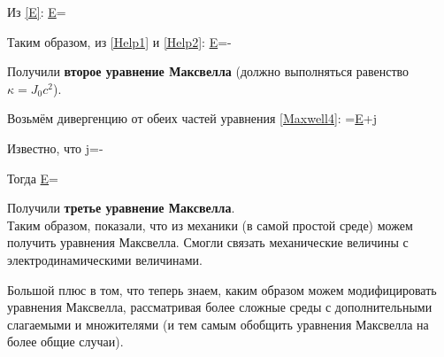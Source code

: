 \documentclass[main.tex]{subfiles}
\begin{document}
Из \eqref{E}:
\beq\label{Help2}
\nabla\times\underline{E}=\nabla\times{}
\eeq

Таким образом, из \eqref{Help1} и \eqref{Help2}:
\beq
\nabla\times\underline{E}=-
\eeq

Получили \textbf{второе уравнение Максвелла} (должно выполняться равенство $\kappa=J_0c^2$).

Возьмём дивергенцию от обеих частей уравнения \eqref{Maxwell4}:
=\nabla\cdot\underline{E}+\nabla\cdot\underline{j}
\eeq

Известно, что
\beq
\nabla\cdot\underline{j}=-
\eeq

Тогда
\beq
{}\nabla\cdot\underline{E}=
\eeq

Получили \textbf{третье уравнение Максвелла}.\\

Таким образом, показали, что из механики (в самой простой среде) можем получить уравнения Максвелла. Смогли связать механические величины с электродинамическими величинами. 

Большой плюс в том, что теперь знаем, каким образом можем модифицировать уравнения Максвелла, рассматривая более сложные среды с дополнительными слагаемыми и множителями (и тем самым обобщить уравнения Максвелла на более общие случаи).
\end{document}
